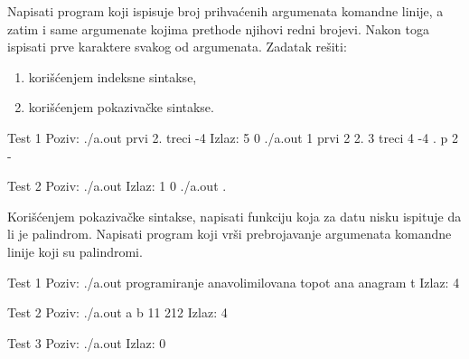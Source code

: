 \begin{Exercise}[label=304]
Napisati program koji ispisuje broj prihvaćenih argumenata
komandne linije, a zatim i same argumenate kojima prethode njihovi
redni brojevi. Nakon toga ispisati prve karaktere svakog od argumenata.
Zadatak rešiti:
\begin{enumerate}
\item korišćenjem indeksne sintakse,
\item korišćenjem pokazivačke sintakse.
\end{enumerate} 

\begin{miditest}
\begin{test}{Test 1}
Poziv: ./a.out prvi 2. treci -4
Izlaz: 5
       0 ./a.out
       1 prvi
       2 2.
       3 treci
       4 -4
       . p 2 -
\end{test}
\end{miditest} 
\begin{minitest}
\begin{test}{Test 2}
Poziv: ./a.out 
Izlaz: 1
       0 ./a.out
       . 
\end{test}
\end{minitest} 

\end{Exercise}
\begin{Answer}[ref=304]
\end{Answer}

\begin{Exercise}[label=305]
Korišćenjem pokazivačke sintakse, napisati funkciju koja
za datu nisku ispituje da li je palindrom. Napisati program koji
vrši prebrojavanje argumenata komandne linije koji su
palindromi.

\begin{maxitest}
\begin{test}{Test 1}
Poziv:  ./a.out programiranje anavolimilovana topot ana anagram t
Izlaz:  4
\end{test}
\end{maxitest}

\begin{miditest}
\begin{test}{Test 2}
Poziv: ./a.out a b 11 212 
Izlaz: 4
\end{test}
\end{miditest}
\begin{minitest}
\begin{test}{Test 3}
Poziv: ./a.out 
Izlaz: 0
\end{test}
\end{minitest}

\end{Exercise}
\begin{Answer}[ref=305]
\end{Answer}

